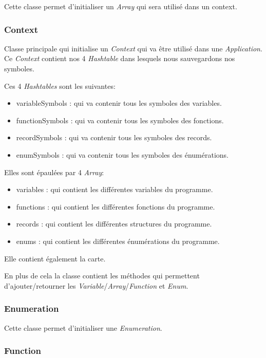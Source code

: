 Cette classe permet d'initialiser un \emph{Array} qui sera utilisé dans un context.

\subsubsection{Context}

Classe principale qui initialise un \emph{Context} qui va être utilisé dans une \emph{Application}. Ce \emph{Context} contient nos 4 \emph{Hashtable} dans lesquels nous sauvegardons nos symboles.

Ces 4 \emph{Hashtables} sont les suivantes:

\begin{itemize}
    \item variableSymbols : qui va contenir tous les symboles des variables.
    \item functionSymbols : qui va contenir tous les symboles des fonctions.
    \item recordSymbols : qui va contenir tous les symboles des records.
    \item enumSymbols : qui va contenir tous les symboles des énumérations.
\end{itemize}

Elles sont épaulées par 4 \emph{Array}:
\begin{itemize}

    \item variables : qui contient les différentes variables du programme.
    \item functions : qui contient les différentes fonctions du programme.
    \item records : qui contient les différentes structures du programme.
    \item enums : qui contient les différentes énumérations du programme.
\end{itemize}

Elle contient également la carte.

En plus de cela la classe contient les méthodes qui permettent d'ajouter/retourner les \emph{Variable}/\emph{Array}/\emph{Function} et \emph{Enum}.

\subsubsection{Enumeration}

Cette classe permet d'initialiser une \emph{Enumeration}.

\subsubsection{Function}

